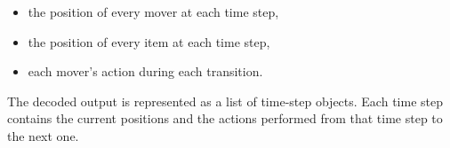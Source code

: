 \begin{itemize}
    \item the position of every mover at each time step,
    \item the position of every item at each time step,
    \item each mover's action during each transition.
\end{itemize}

\noindent The decoded output is represented as a list of time-step objects.
Each time step contains the current positions and the actions performed from that time step to the next one.